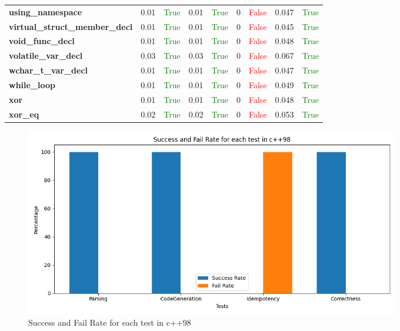 \documentclass{article}
\begin{document}
\begin{xltabular}{\textwidth}{lcccccccc}
\textbf{{\fontsize{10}{12}\selectfont using\_namespace}}& 0.01&\textcolor{green}{True}& 0.01&\textcolor{green}{True}& 0&\textcolor{red}{False}& 0.047&\textcolor{green}{True} \\[0.5ex]
\textbf{{\fontsize{10}{12}\selectfont virtual\_struct\_member\_decl}}& 0.01&\textcolor{green}{True}& 0.01&\textcolor{green}{True}& 0&\textcolor{red}{False}& 0.045&\textcolor{green}{True} \\[0.5ex]
\textbf{{\fontsize{10}{12}\selectfont void\_func\_decl}}& 0.01&\textcolor{green}{True}& 0.01&\textcolor{green}{True}& 0&\textcolor{red}{False}& 0.048&\textcolor{green}{True} \\[0.5ex]
\textbf{{\fontsize{10}{12}\selectfont volatile\_var\_decl}}& 0.03&\textcolor{green}{True}& 0.03&\textcolor{green}{True}& 0&\textcolor{red}{False}& 0.067&\textcolor{green}{True} \\[0.5ex]
\textbf{{\fontsize{10}{12}\selectfont wchar\_t\_var\_decl}}& 0.01&\textcolor{green}{True}& 0.01&\textcolor{green}{True}& 0&\textcolor{red}{False}& 0.047&\textcolor{green}{True} \\[0.5ex]
\textbf{{\fontsize{10}{12}\selectfont while\_loop}}& 0.01&\textcolor{green}{True}& 0.01&\textcolor{green}{True}& 0&\textcolor{red}{False}& 0.049&\textcolor{green}{True} \\[0.5ex]
\textbf{{\fontsize{10}{12}\selectfont xor}}& 0.01&\textcolor{green}{True}& 0.01&\textcolor{green}{True}& 0&\textcolor{red}{False}& 0.048&\textcolor{green}{True} \\[0.5ex]
\textbf{{\fontsize{10}{12}\selectfont xor\_eq}}& 0.02&\textcolor{green}{True}& 0.02&\textcolor{green}{True}& 0&\textcolor{red}{False}& 0.053&\textcolor{green}{True} \\[0.5ex]
\bottomrule
\end{xltabular}
\newpage
\begin{figure}[h!]
\centering
\includegraphics[width=0.8\textwidth]{../reports/artisan/images/c++98.png}
\caption{Success and Fail Rate for each test in c++98}
\label{fig:c++98}
\end{figure}
\newpage
\end{document}
